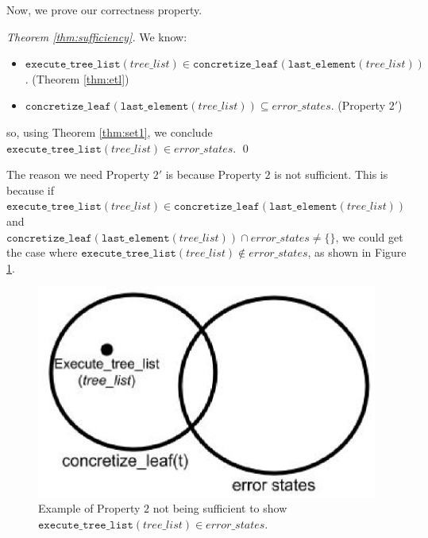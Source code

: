 Now, we prove our correctness property.

\begin{proof}[Theorem \ref{thm:sufficiency}]
We know:
\begin{itemize}
\item $\mathtt{execute\_tree\_list}(tree\_list) \in \mathtt{concretize\_leaf}(\mathtt{last\_element}(tree\_list))$. (Theorem \ref{thm:etl})
\item $\mathtt{concretize\_leaf} (\mathtt{last\_element} (tree\_list)) \subseteq error\_states$. (Property $2'$)
\end{itemize}
so, using Theorem \ref{thm:set1}, we conclude
$\mathtt{execute\_tree\_list} (tree\_list) \in error\_states$. \qed
\end{proof}

The reason we need Property $2'$ is because Property $2$ is not sufficient. 
This is because if $\mathtt{execute\_tree\_list} (tree\_list) \in \mathtt{concretize\_leaf} (\mathtt{last\_element}(tree\_list))$ and \\
$\mathtt{concretize\_leaf} (\mathtt{last\_element} (tree\_list)) \cap error\_states \neq \{\}$, we could get the case where
$\mathtt{execute\_tree\_list} (tree\_list) \notin error\_states$, as shown in Figure \ref{fig:Prop2}.

\begin{figure}
\includegraphics[width=\textwidth]{prop2.eps}
\caption{Example of Property $2$ not being sufficient to show $\mathtt{execute\_tree\_list} (tree\_list) \in error\_states$.}
\label{fig:Prop2}
\end{figure}




